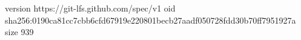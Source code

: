 version https://git-lfs.github.com/spec/v1
oid sha256:0190ca81cc7cbb6cfd67919e220801becb27aadf050728fdd30b70ff7951927a
size 939
